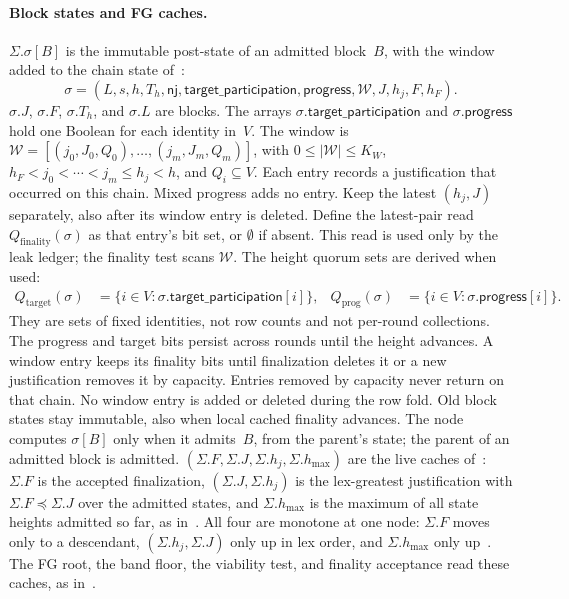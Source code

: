 \documentclass{article}
\theoremstyle{plain}
\theoremstyle{definition}
\theoremstyle{remark}
\newcommand{\targetParticipation}{\mathsf{target\_participation}}
\newcommand{\progressBit}{\mathsf{progress}}
\newcommand{\Qtarget}{Q_{\mathrm{target}}}
\newcommand{\Qprog}{Q_{\mathrm{prog}}}
\newcommand{\Qfin}{Q_{\mathrm{finality}}}
\newcommand{\nj}{\mathsf{nj}}
\newcommand{\hmax}{h_{\max}}
\newcommand{\DC}[1]{\cite[\S#1]{DC}}
\newcommand{\LDP}[1]{\cite[\S#1]{LDP}}
\begin{document}
\paragraph{Block states and FG caches.}  $\Sigma.\sigma[B]$ is the
immutable post-state of an admitted block~$B$, with the window added to
the chain state of~\DC{4}:
\[
 \sigma=(L,s,h,T_h,\nj,\targetParticipation,\progressBit,\mathcal{W},
 J,h_j,F,h_F).
\]
$\sigma.J$, $\sigma.F$, $\sigma.T_h$, and $\sigma.L$ are blocks.  The
arrays $\sigma.\targetParticipation$ and $\sigma.\progressBit$ hold
one Boolean for each identity in~$V$.  The window is
$\mathcal{W}=[(j_0,J_0,Q_0),\ldots,(j_m,J_m,Q_m)]$, with $0\leq|\mathcal{W}|\leq K_W$,
$h_F<j_0<\cdots<j_m\leq h_j<h$, and $Q_i\subseteq V$.
Each entry records a justification that occurred on this chain.
Mixed progress adds no entry.  Keep the latest $(h_j,J)$ separately,
also after its window entry is deleted.  Define the latest-pair read
$\Qfin(\sigma)$ as that entry's bit set, or $\emptyset$ if absent.
This read is used only by the leak ledger; the finality test scans $\mathcal{W}$.
The height quorum sets are derived when used:
\[
 \begin{aligned}
  \Qtarget(\sigma)&=\{i\in V:\sigma.\targetParticipation[i]\},&
  \Qprog(\sigma)&=\{i\in V:\sigma.\progressBit[i]\}.
 \end{aligned}
\]
They are sets of fixed identities, not row counts and not per-round
collections.  The progress and target bits persist across rounds until
the height advances.  A window entry keeps its finality bits until
finalization deletes it or a new justification removes it by capacity.
Entries removed by capacity never return on that chain.
No window entry is added or deleted during the row fold.  Old block states stay
immutable, also when local cached finality advances.
The node computes $\sigma[B]$ only when it admits~$B$,
from the parent's state; the parent of an admitted block is admitted.
$(\Sigma.F,\Sigma.J,\Sigma.h_j,\Sigma.\hmax)$ are the live caches
of~\DC{5}: $\Sigma.F$ is the accepted finalization, $(\Sigma.J,\Sigma.h_j)$
is the lex-greatest justification with $\Sigma.F\preceq\Sigma.J$ over the
admitted states, and $\Sigma.\hmax$ is the maximum of all state heights
admitted so far, as in~\DC{5}.  All four are monotone at one node: $\Sigma.F$ moves only to a
descendant, $(\Sigma.h_j,\Sigma.J)$ only up in lex order, and
$\Sigma.\hmax$ only up~\LDP{4.2}.  The FG root, the band floor, the
viability test, and finality acceptance read these caches, as
in~\cite{DC}.
\end{document}
